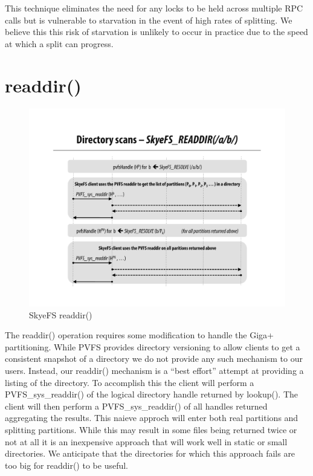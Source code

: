 \documentclass[letterpaper]{article}
\begin{document}
This technique eliminates the need for any locks to be held across multiple RPC
calls but is vulnerable to starvation in the event of high rates of splitting.
We believe this this risk of starvation is unlikely to occur in practice due to
the speed at which a split can progress.

\section{readdir()}
\begin{figure}
\begin{center}
\includegraphics[scale=0.4]{figure-readdir}
\end{center}
\caption{SkyeFS readdir()}
\end{figure}
The readdir() operation requires some modification to handle the Giga+
partitioning.  While PVFS provides directory versioning to allow clients to
get a consistent snapshot of a directory we do not provide any such mechanism
to our users.  Instead, our readdir() mechanism is a ``best effort'' attempt
at providing a listing of the directory.  To accomplish this the client will
perform a PVFS\_sys\_readdir() of the logical directory handle returned by
lookup().  The client will then perform a PVFS\_sys\_readdir() of all handles
returned aggregating the results.  This naieve approch will enter both real
partitions and splitting partitions.  While this may result in some files
being returned twice or not at all it is an inexpensive approach that will
work well in static or small directories.  We anticipate that the directories
for which this approach fails are too big for readdir() to be useful.
\end{document}
